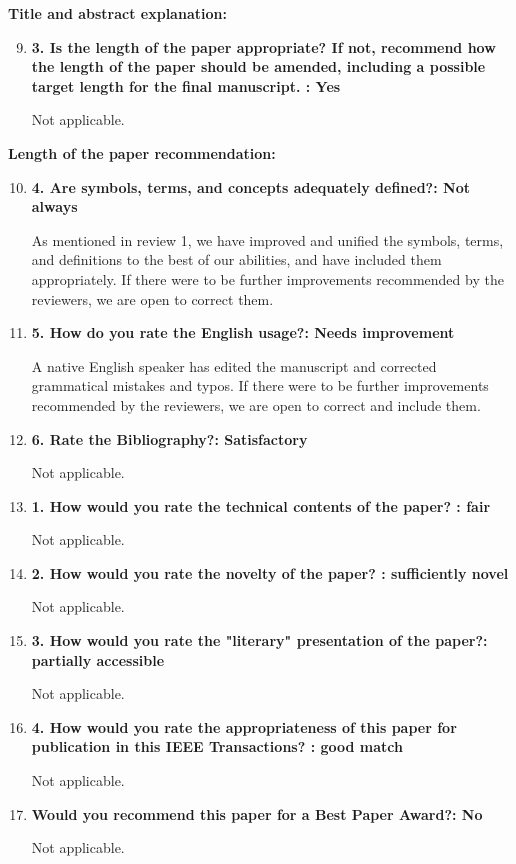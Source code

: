 \documentclass[12pt]{article}
\begin{document}
\textbf{Title and abstract explanation:}


\begin{enumerate}
\setcounter{enumi}{8}
\item \textbf{3. Is the length of the paper appropriate? If not, recommend how the length 
of the paper should be amended, including a possible target length for the final 
manuscript. : Yes}

Not applicable.

\end{enumerate}


\textbf{Length of the paper recommendation:}

\begin{enumerate}
\setcounter{enumi}{9}

\item  \textbf{4. Are symbols, terms, and concepts adequately defined?: Not always}

As mentioned in review 1, we have improved and unified the symbols, terms, and 
definitions to the best of our 
abilities, and have 
included 
them appropriately.  If there 
were to be further improvements recommended by the reviewers, we are open to correct 
them. 

\item \textbf{5. How do you rate the English usage?: Needs improvement}

A native 
English 
speaker has edited the manuscript and corrected  grammatical mistakes and typos.  
If there 
were to be further improvements recommended by the reviewers, we are open to correct and 
include  
them. 

\item \textbf{6. Rate the Bibliography?: Satisfactory}

Not applicable.

\item \textbf{1. How would you rate the technical contents of the paper? : fair}

Not applicable.

\item \textbf{2. How would you rate the novelty of the paper? : sufficiently novel}

Not applicable.

\item \textbf{3. How would you rate the "literary" presentation of the paper?: partially 
accessible}

Not applicable.

\item  \textbf{4. How would you rate the appropriateness of this paper for publication in 
this IEEE Transactions? : good match}

Not applicable.

\item \textbf{Would you recommend this paper for a Best Paper Award?: No}

Not applicable.

\end{enumerate}
\end{document}
